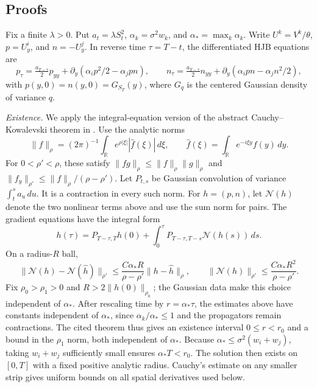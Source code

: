 \documentclass[mnsc]{informs3}
\begin{document}
\newpage
\begin{APPENDICES}


\section{Proofs}

{{
Fix a finite $\lambda>0$. Put $a_t=\lambda S_t^2$,
$\alpha_k=\sigma^2w_k$, and $\alpha_*=\max_k\alpha_k$.
Write $U^k=V^k/\theta$, $p=U_y^i$, and $n=-U_y^j$.
In reverse time $\tau=T-t$, the differentiated HJB equations are
\[
p_\tau=\tfrac{a_{T-\tau}}2p_{yy}
+\partial_y(\alpha_ip^2/2-\alpha_jpn),\qquad
n_\tau=\tfrac{a_{T-\tau}}2n_{yy}
+\partial_y(\alpha_ipn-\alpha_jn^2/2),
\]
with $p(y,0)=n(y,0)=G_{S_T}(y)$, where $G_q$ is the centered
Gaussian density of variance $q$.

\emph{Existence.}
We apply the integral-equation version of the abstract
Cauchy--Kowalevski theorem in \citet[][Chapter III, Remark 2.3]{Nishida1978}.
Use the analytic norms
\[
\|f\|_\rho=(2\pi)^{-1}\int_{\mathbb R}
e^{\rho|\xi|}|\widehat f(\xi)|\,d\xi,
\qquad \widehat f(\xi)=\int_{\mathbb R}e^{-i\xi y}f(y)\,dy.
\]
For $0<\rho'<\rho$, these satisfy
$\|fg\|_\rho\leq\|f\|_\rho\|g\|_\rho$ and
$\|f_y\|_{\rho'}\leq\|f\|_\rho/(\rho-\rho')$.
Let $P_{t,s}$ be Gaussian convolution of variance $\int_t^sa_u\,du$.
It is a contraction in every such norm.
For $h=(p,n)$, let $\mathcal N(h)$ denote the two nonlinear terms
above and use the sum norm for pairs. The gradient equations have
the integral form
\begin{equation}\label{eq-equilibrium-gradient-mild}
h(\tau)=P_{T-\tau,T}h(0)
+\int_0^\tau P_{T-\tau,T-s}\mathcal N(h(s))\,ds.
\end{equation}
On a radius-$R$ ball,
\[
\|\mathcal N(h)-\mathcal N(\widehat h)\|_{\rho'}
\leq\frac{C\alpha_*R}{\rho-\rho'}\|h-\widehat h\|_\rho,
\qquad
\|\mathcal N(h)\|_{\rho'}\leq
\frac{C\alpha_*R^2}{\rho-\rho'}.
\]
Fix $\rho_0>\rho_1>0$ and $R>2\|h(0)\|_{\rho_0}$;
the Gaussian data make this choice independent of $\alpha_*$.
After rescaling time by $r=\alpha_*\tau$, the estimates above have
constants independent of $\alpha_*$, since $\alpha_k/\alpha_*\leq1$
and the propagators remain contractions.
The cited theorem thus gives an existence interval $0\leq r<r_0$
and a bound in the $\rho_1$ norm, both independent of $\alpha_*$.
Because $\alpha_*\leq\sigma^2(w_i+w_j)$, taking $w_i+w_j$ sufficiently
small ensures $\alpha_*T<r_0$. The solution then exists on $[0,T]$ with
a fixed positive analytic radius. Cauchy's estimate on any smaller strip
gives uniform bounds on all spatial derivatives used below.

}}
\end{APPENDICES}
\end{document}
